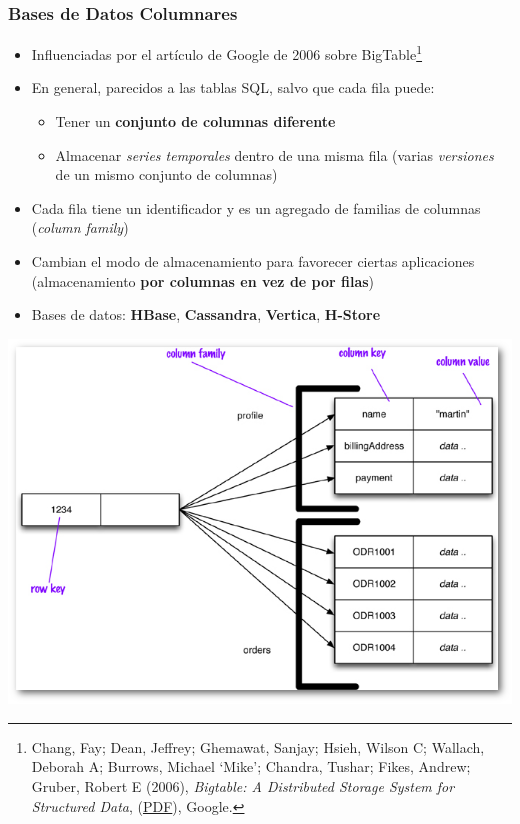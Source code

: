 \documentclass[14pt]{beamer}
\begin{document}
\begin{frame}[allowframebreaks]
  \frametitle{Bases de Datos Columnares}
\begin{itemize}
\item Influenciadas por el artículo de Google de 2006 sobre
  BigTable\footnote{Chang, Fay; Dean, Jeffrey; Ghemawat, Sanjay; Hsieh,
    Wilson C; Wallach, Deborah A; Burrows, Michael ‘Mike’; Chandra, Tushar;
    Fikes, Andrew; Gruber, Robert E (2006), {\em Bigtable: A Distributed
      Storage System for Structured Data},
    (\href{http://research.google.com/archive/bigtable-osdi06.pdf}{PDF}),
    Google.}
\item En general, parecidos a las tablas SQL, salvo que cada fila puede:
  \begin{itemize}
  \item Tener un {\bf conjunto de columnas diferente}
\item Almacenar {\em series temporales} dentro de una misma fila (varias
  {\em versiones} de un mismo conjunto de columnas)
  \end{itemize}
\item Cada fila tiene un identificador y es un agregado de familias de
  columnas ({\em column family})
\item Cambian el modo de almacenamiento para favorecer ciertas aplicaciones
  (almacenamiento {\bf por columnas en vez de por filas})
\item Bases de datos: {\bf HBase}, {\bf Cassandra}, {\bf Vertica}, {\bf
    H-Store}
\end{itemize}
\end{frame}

\begin{frame}[plain]
\includegraphics[width=\textwidth]{img/column}
\end{frame}
\end{document}
